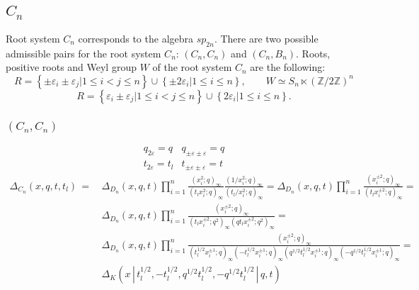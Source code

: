 \documentclass{article}
\def\nn{\nonumber}
\def\nn{\nonumber}
\def\ve{\varepsilon}
\def\ep{\varepsilon}
\begin{document}
\subsection*{$C_n$}
Root system $C_n$ corresponds to the algebra $sp_{2n}$. There are two possible admissible pairs for the root system $C_n$: $(C_n,C_n)$ and $(C_n,B_n)$. Roots, positive roots and Weyl group $W$ of the root system $C_n$ are the following:
\begin{equation}
    R =  \left\{\pm  \ve_i\pm \ve_j| 1\leq i < j \leq n\right\}\cup\left\{\pm 2\ve_i | 1\leq i\leq n \right\} , \quad\quad W \simeq S_{n} \ltimes (\mathbb{Z}/2\mathbb{Z})^n\end{equation}
    \begin{equation}
    R =  \left\{\ve_i\pm \ve_j| 1\leq i < j \leq n\right\}\cup\left\{2\ve_i | 1\leq i\leq n \right\}.\end{equation}

\subsubsection*{$(C_n,C_n)$}
\begin{equation}
    \begin{array}{ll}
       q_{2\ep} = q  &  q_{\pm \ep \pm \ep} = q  \\
        t_{2\ep} = t_l &  t_{\pm \ep \pm \ep} =t
    \end{array}
\end{equation}
      \begin{align}
        \Delta_{C_n} (x,q,t,t_l)\, =\, &  \Delta_{D_n}(x,q,t) \prod_{i=1}^{n}  \frac{\left( x_i^2;q\right)_{\infty}}{\left(t_l x_i^2 ;q\right)_{\infty}}  \frac{\left( 1/x_i^2;q\right)_{\infty}}{\left(t_l/x_i^2 ;q\right)_{\infty}} = \Delta_{D_n}(x,q,t) \prod_{i=1}^{n}  \frac{\left( x_i^{\pm 2};q\right)_{\infty}}{\left(t_l x_i^{\pm 2} ;q\right)_{\infty}} = \nn \\
     &   \Delta_{D_n}(x,q,t) \prod_{i=1}^{n} \frac{\left( x_i^{\pm 2};q\right)_{\infty}}{\left( t_l x_i^{\pm 2};q^2\right)_{\infty}\left( q t_l x_i^{\pm 2};q^2\right)_{\infty}} = \nn \\ &
    \Delta_{D_n}(x,q,t) \prod_{i=1}^{n}
    \frac{\left( x_i^{\pm 2};q\right)_{\infty}}{\left( t_l^{1/2} x_i^{\pm 1};q\right)_{\infty}\left( -t_l^{1/2} x_i^{\pm 1};q\right)_{\infty}\left( q^{1/2} t_l^{1/2} x_i^{\pm 1};q\right)_{\infty}\left( -q^{1/2} t_l^{1/2} x_i^{\pm 1};q\right)_{\infty}} = \nn \\
    & \boxed{ \Delta_{K}(x\,|\, t_l^{1/2},-t_l^{1/2}, q^{1/2}t_l^{1/2},-q^{1/2}t_l^{1/2}\,|\,q,t)}
    \end{align}
\end{document}
